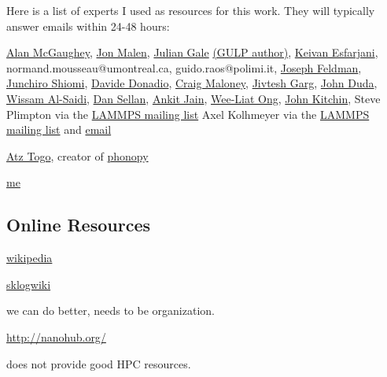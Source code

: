 Here is a list of experts I used as resources for this work. They 
will typically answer emails within 24-48 hours:


\href{http://ntpl.me.cmu.edu/people.html}
{Alan McGaughey},
\href{http://www.cmu.edu/me/malen/Lab_Website/People.html}
{Jon Malen},
\href{http://chemistry.curtin.edu.au/people/academic.cfm/J.Gale}
{Julian Gale} 
\href{http://projects.ivec.org/gulp/news.html}
{(GULP author)},
\href{http://mech.rutgers.edu/content/keivan-esfarjani}
{Keivan Esfarjani},
normand.mousseau@umontreal.ca,
guido.raos@polimi.it,
\href{mailto:joseph.feldman.ctr@nrl.navy.mil}
{Joseph Feldman},
\href{http://www.phonon.t.u-tokyo.ac.jp/}
{Junchiro Shiomi},
\href{http://www2.mpip-mainz.mpg.de/~donadio/tnt/People.html}
{Davide Donadio},
\href{http://www.ce.cmu.edu/people/faculty/maloney.html}
{Craig Maloney},
\href{http://quasiamore.mit.edu/pmwiki.php?n=Main.JivteshGarg}
{Jivtesh Garg},
\href{John Duda}
{John Duda},
\href{Wissam Al-Saidi}
{Wissam Al-Saidi},
\href{Dan Sellan}
{Dan Sellan},
\href{Ankit Jain}
{Ankit Jain},
\href{wong@andrew.cmu.edu}
{Wee-Liat Ong},
\href{John Kitchin}
{John Kitchin},
Steve Plimpton via the 
\href{http://lammps.sandia.gov/threads/threads.html}{LAMMPS mailing list} 
Axel Kolhmeyer via the 
\href{http://lammps.sandia.gov/threads/threads.html}{LAMMPS mailing list} 
and \href{akohlmey@gmail.com}{email}

\href{http://atztogo.users.sourceforge.net/}{Atz Togo}, creator of 
\href{http://phonopy.sourceforge.net/}{phonopy}

\href{http://jasonlarkin.github.io}{me}

\subsection{Online Resources}

\href{https://en.wikipedia.org/wiki/Lennard-Jones_potential}
{wikipedia}

\href{http://www.sklogwiki.org/}
{sklogwiki}

we can do better, needs to be organization. 

\href{http://nanohub.org/}{http://nanohub.org/}

does not provide good HPC resources. 




